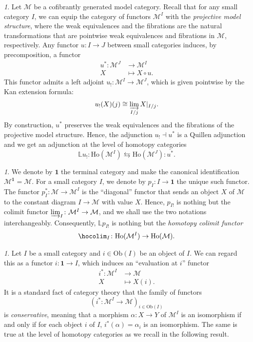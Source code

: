 \documentclass[reqno]{amsart}
\theoremstyle{plain}
\theoremstyle{definition}
\theoremstyle{remark}
\newtheorem{paragr}[subsubsection]{} %
\newcommand{\M}{\mathcal{M}}
\newcommand{\ilim}{\varinjlim} %
\newcommand{\fun}[2]{{#2}^{#1}} %
\newcommand{\Ob}{\mathrm{Ob}} %
\newcommand{\tr}[2]{#1/#2} %
\newcommand{\ctg}[1]{\mathbf{#1}}  %
\newcommand{\Term}{\ctg{1}} %
\newcommand{\LL}{\mathbb{L}} %
\newcommand{\Loc}[1]{\mathrm{Ho}(#1)} %
\newcommand{\GZ}[1]{\overline{#1}} %
\begin{document}
\begin{paragr}\label{paragr:htpykan} Let $\M$ be a cofibrantly generated model
category. Recall that for any small category $I$, we can equip the
category of functors $\fun{I}{\M}$ with the \emph{projective model
structure}, where the weak equivalences and the fibrations are the
natural transformations that are pointwise weak equivalences and
fibrations in $\M$, respectively. Any functor $u \colon I \to J$
between small categories induces, by precomposition, a functor
  \begin{align*} u^* \colon \fun{J}{\M} &\to \fun{I}{\M}\\ X &\mapsto
X\circ u.
  \end{align*} This functor admits a left adjoint $u_!
\colon\fun{I}{\M} \to \fun{J}{\M} $, which is given pointwise by the Kan
extension formula:
  \[ u_!(X)(j)\cong\ilim_{\tr{I}{j}}X\vert_{\tr{I}{j}}.
  \] By construction, $u^*$ preserves the weak equivalences and the
fibrations of the projective model structure. Hence, the adjunction
$u_! \dashv u^*$ is a Quillen adjunction and we get an adjunction at
the level of homotopy categories
  \[ \LL u_! \colon \Loc{\fun{I}{\M}} \leftrightarrows
\Loc{\fun{J}{\M}} \colon \GZ{u^*}.
  \]
\end{paragr}
\begin{paragr}\label{paragr:hocolim} We denote by $\Term$ the terminal category and make the
canonical identification $\fun{\Term}{\M}=\M$. For a small category
$I$, we denote by $p_I \colon I \to \Term$ the unique such
functor. The functor $p_I^* \colon \M \to \fun{I}{\M}$ is the
``diagonal'' functor that sends an object $X$ of $\M$ to the
constant diagram $I \to \M$ with value $X$. Hence, $p_{I!}$ is nothing
but the colimit functor $\ilim_I \colon \fun{I}{\M} \to \M$, and we
shall use the two notations interchangeably. Consequently, $\LL
p_{I!}$ is nothing but the \emph{homotopy colimit functor}
\[
  \hocolim_I \colon \Loc{\fun{I}{\M}} \to \Loc{\M}.
  \]
\end{paragr}
\begin{paragr} Let $I$ be a small category and $i \in \Ob(I)$ be an
object of $I$. We can regard this as a functor $i \colon \Term \to I$,
which induces an ``evaluation at $i$'' functor
  \begin{align*} i^* \colon \fun{I}{\M} &\to \M\\ X &\mapsto X(i).
  \end{align*} It is a standard fact of category theory that the
family of functors
  \[\left(i^*\colon \fun{I}{\M} \to \M\right)_{i\in \Ob(I)}\] is
\emph{conservative}, meaning that a morphism $\alpha \colon X \to Y$
of $\fun{I}{\M}$ is an isomorphism if and only if for each object $i$
of $I$, $i^*(\alpha)=\alpha_i$ is an isomorphism. The same is true at
the level of homotopy categories as we recall in the following result.
\end{paragr}
\end{document}
